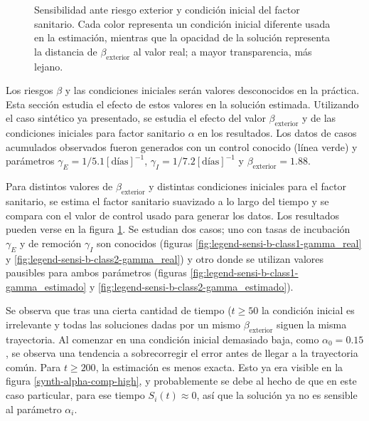 \begin{figure}[H]
\caption[Sensibilidad ante riesgo exterior y condición inicial del factor sanitario.]{Sensibilidad ante riesgo exterior y condición inicial del factor sanitario. Cada color representa un condición inicial diferente usada en la estimación, mientras que la opacidad de la solución representa la distancia de \(\beta_{\text{exterior}}\) al valor real; a mayor transparencia, más lejano.} \label{fig:legend-sensi-b}
\end{figure}

Los riesgos \(\beta \) y las condiciones iniciales serán valores desconocidos en la práctica. Esta sección estudia el efecto de estos valores en la solución estimada. Utilizando el caso sintético ya presentado, se estudia el efecto del valor \(\beta_{\text{exterior}}\) y de las condiciones iniciales para factor sanitario \(\alpha\) en los resultados. Los datos de casos acumulados observados fueron generados con un control conocido (línea verde) y parámetros \(\gamma_E = 1/5.1 [\text{días}]^{-1}\), \(\gamma_I = 1/7.2 [\text{días}]^{-1}\) y \(\beta_{\text{exterior}} = 1.88\).


Para distintos valores de \(\beta_{\text{exterior}}\) y distintas condiciones iniciales para el factor sanitario, se estima el factor sanitario suavizado a lo largo del tiempo y se compara con el valor de control usado para generar los datos. Los resultados pueden verse en la figura \ref{fig:legend-sensi-b}. Se estudian dos casos; uno con tasas de incubación \(\gamma_E\) y de remoción \(\gamma_I\) son conocidos (figuras \ref{fig:legend-sensi-b-class1-gamma_real} y \ref{fig:legend-sensi-b-class2-gamma_real}) y otro donde se utilizan valores pausibles para ambos parámetros (figuras \ref{fig:legend-sensi-b-class1-gamma_estimado} y \ref{fig:legend-sensi-b-class2-gamma_estimado}).

Se observa que tras una cierta cantidad de tiempo (\(t \geq 50\) la condición inicial es irrelevante y todas las soluciones dadas por un mismo \(\beta_{\text{exterior}}\) siguen la misma trayectoria. Al comenzar en una condición inicial demasiado baja, como \(\alpha_0 = 0.15\), se observa una tendencia a sobrecorregir el error antes de llegar a la trayectoria común. Para \(t \geq 200\), la estimación es menos exacta. Esto ya era visible en la figura \ref{synth-alpha-comp-high}, y probablemente se debe al hecho de que en este caso particular, para ese tiempo \(S_i(t) \approx 0\), así que la solución ya no es sensible al parámetro \(\alpha_i\).

